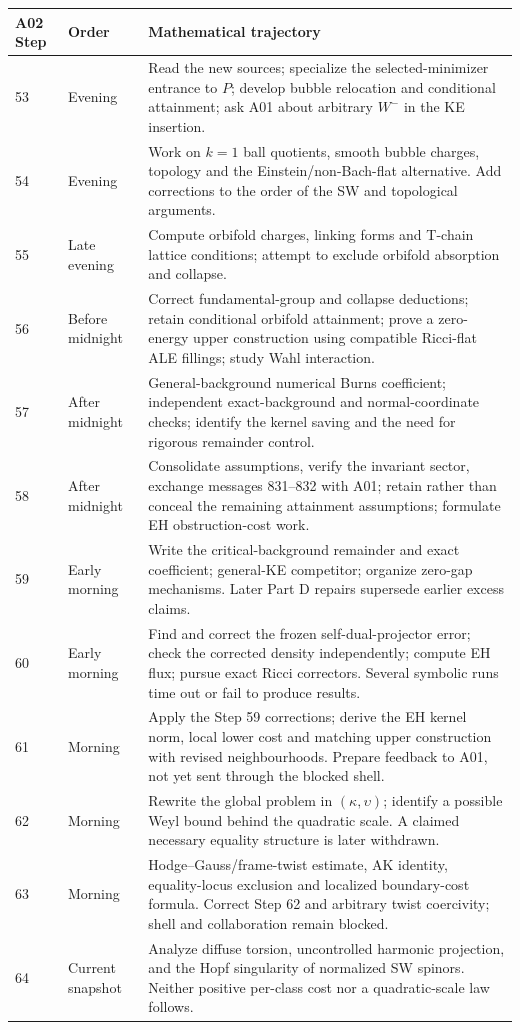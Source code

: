 \documentclass[11pt]{article}
\theoremstyle{remark}
\begin{document}
\begin{longtable}{@{}p{}p{}p{}@{}}
\toprule A02 Step & Order & Mathematical trajectory\\\midrule\endhead
53 & Evening & Read the new sources; specialize the selected-minimizer
entrance to $P$; develop bubble relocation and conditional attainment;
ask A01 about arbitrary $W^-$ in the KE insertion.\\
54 & Evening & Work on $k=1$ ball quotients, smooth bubble charges,
topology and the Einstein/non-Bach-flat alternative. Add corrections to
the order of the SW and topological arguments.\\
55 & Late evening & Compute orbifold charges, linking forms and T-chain
lattice conditions; attempt to exclude orbifold absorption and collapse.\\
56 & Before midnight & Correct fundamental-group and collapse deductions;
retain conditional orbifold attainment; prove a zero-energy upper
construction using compatible Ricci-flat ALE fillings; study Wahl interaction.\\
57 & After midnight & General-background numerical Burns coefficient;
independent exact-background and normal-coordinate checks; identify
the kernel saving and the need for rigorous remainder control.\\
58 & After midnight & Consolidate assumptions, verify the invariant sector,
exchange messages 831--832 with A01; retain rather than conceal the remaining
attainment assumptions; formulate EH obstruction-cost work.\\
59 & Early morning & Write the critical-background remainder and exact
coefficient; general-KE competitor; organize zero-gap mechanisms. Later
Part D repairs supersede earlier excess claims.\\
60 & Early morning & Find and correct the frozen self-dual-projector error;
check the corrected density independently; compute EH flux; pursue exact
Ricci correctors. Several symbolic runs time out or fail to produce results.\\
61 & Morning & Apply the Step 59 corrections; derive the EH kernel norm,
local lower cost and matching upper construction with revised neighbourhoods.
Prepare feedback to A01, not yet sent through the blocked shell.\\
62 & Morning & Rewrite the global problem in $(\kappa,\upsilon)$;
identify a possible Weyl bound behind the quadratic scale. A claimed
necessary equality structure is later withdrawn.\\
63 & Morning & Hodge--Gauss/frame-twist estimate, AK identity, equality-locus
exclusion and localized boundary-cost formula. Correct Step 62 and arbitrary
twist coercivity; shell and collaboration remain blocked.\\
64 & Current snapshot & Analyze diffuse torsion, uncontrolled harmonic
projection, and the Hopf singularity of normalized SW spinors. Neither
positive per-class cost nor a quadratic-scale law follows.\\
\bottomrule
\end{longtable}
\end{document}

